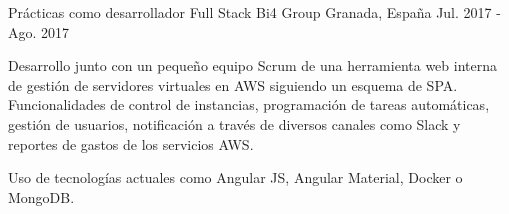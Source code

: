 


\begin{cventries}


\cventry
{Prácticas como desarrollador Full Stack } %
{Bi4 Group} %
{Granada, España} %
{Jul. 2017 - Ago. 2017} %
{ %
\begin{cvitems}
\item {Desarrollo junto con un pequeño equipo Scrum de una herramienta web interna de gestión de servidores virtuales en AWS siguiendo un esquema de SPA. Funcionalidades de control de instancias, programación de tareas automáticas, gestión de usuarios, notificación a través de diversos canales como Slack y reportes de gastos de los servicios AWS.}
\item {Uso de tecnologías actuales como Angular JS, Angular Material, Docker o MongoDB.}
\end{cvitems}
}


\end{cventries}